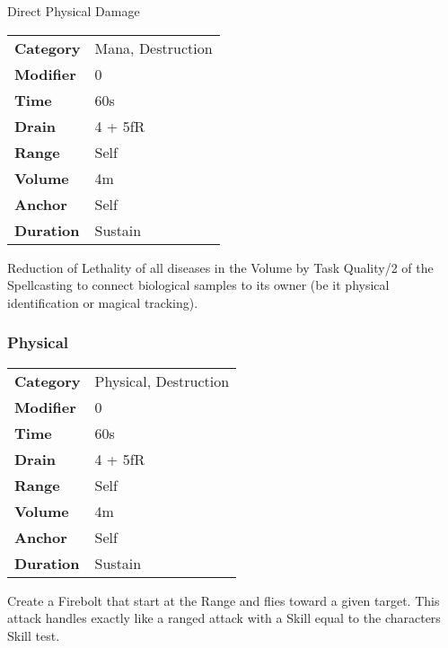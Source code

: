 \hfil

Direct Physical Damage



\begin{tabular}{ll}
    \textbf{Category} & Mana, Destruction \\
    \textbf{Modifier} & 0                 \\
    \textbf{Time}     & 60s               \\
    \textbf{Drain}    & 4 + 5fR           \\
    \textbf{Range}    & Self              \\
    \textbf{Volume}   & 4m                \\
    \textbf{Anchor}   & Self              \\
    \textbf{Duration} & Sustain           \\
\end{tabular}

\hfil

Reduction of Lethality of all diseases in the Volume by Task
Quality/2 of the
Spellcasting to
connect biological samples to its owner (be it physical identification
or magical tracking).

\subsubsection{Physical}


\begin{tabular}{ll}
    \textbf{Category} & Physical, Destruction \\
    \textbf{Modifier} & 0                     \\
    \textbf{Time}     & 60s                   \\
    \textbf{Drain}    & 4 + 5fR               \\
    \textbf{Range}    & Self                  \\
    \textbf{Volume}   & 4m                    \\
    \textbf{Anchor}   & Self                  \\
    \textbf{Duration} & Sustain               \\
\end{tabular}

\hfil

Create a Firebolt that start at the Range and flies toward a given
target. This attack handles exactly like a ranged attack with a Skill
equal to the characters Skill test.


